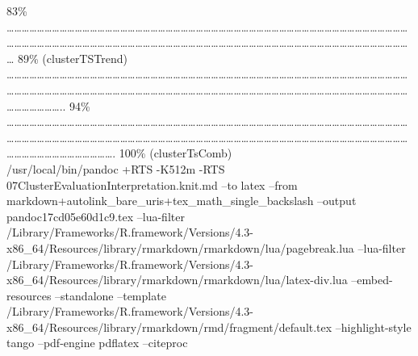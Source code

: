 \documentclass[
]{article}
\begin{document}
\textbar{} 83\% \textbar{}
\textbar\ldots\ldots\ldots\ldots\ldots\ldots\ldots\ldots\ldots\ldots\ldots\ldots\ldots\ldots\ldots\ldots\ldots\ldots\ldots\ldots\ldots\ldots\ldots\ldots\ldots\ldots\ldots\ldots\ldots\ldots\ldots\ldots\ldots\ldots\ldots\ldots\ldots\ldots\ldots\ldots\ldots\ldots\ldots\ldots\ldots\ldots\ldots\ldots\ldots\ldots\ldots\ldots\ldots\ldots\ldots\ldots\ldots\ldots\ldots\ldots\ldots\ldots\ldots\ldots\ldots\ldots\ldots\ldots\ldots\ldots\ldots\ldots\ldots\ldots\ldots\ldots\ldots\ldots\ldots\ldots\ldots\ldots\ldots\ldots\ldots\ldots\ldots\ldots\ldots\ldots\ldots\ldots\ldots\ldots\ldots\ldots\ldots\ldots\ldots\ldots\ldots\ldots\ldots\ldots\ldots\ldots\ldots{}
\textbar{} 89\% (clusterTSTrend) \textbar{}
\textbar\ldots\ldots\ldots\ldots\ldots\ldots\ldots\ldots\ldots\ldots\ldots\ldots\ldots\ldots\ldots\ldots\ldots\ldots\ldots\ldots\ldots\ldots\ldots\ldots\ldots\ldots\ldots\ldots\ldots\ldots\ldots\ldots\ldots\ldots\ldots\ldots\ldots\ldots\ldots\ldots\ldots\ldots\ldots\ldots\ldots\ldots\ldots\ldots\ldots\ldots\ldots\ldots\ldots\ldots\ldots\ldots\ldots\ldots\ldots\ldots\ldots\ldots\ldots\ldots\ldots\ldots\ldots\ldots\ldots\ldots\ldots\ldots\ldots\ldots\ldots\ldots\ldots\ldots\ldots\ldots\ldots\ldots\ldots\ldots\ldots\ldots\ldots\ldots\ldots\ldots\ldots\ldots\ldots\ldots\ldots\ldots\ldots\ldots\ldots\ldots\ldots\ldots\ldots\ldots\ldots\ldots\ldots\ldots\ldots\ldots\ldots\ldots\ldots..
\textbar{} 94\% \textbar{}
\textbar\ldots\ldots\ldots\ldots\ldots\ldots\ldots\ldots\ldots\ldots\ldots\ldots\ldots\ldots\ldots\ldots\ldots\ldots\ldots\ldots\ldots\ldots\ldots\ldots\ldots\ldots\ldots\ldots\ldots\ldots\ldots\ldots\ldots\ldots\ldots\ldots\ldots\ldots\ldots\ldots\ldots\ldots\ldots\ldots\ldots\ldots\ldots\ldots\ldots\ldots\ldots\ldots\ldots\ldots\ldots\ldots\ldots\ldots\ldots\ldots\ldots\ldots\ldots\ldots\ldots\ldots\ldots\ldots\ldots\ldots\ldots\ldots\ldots\ldots\ldots\ldots\ldots\ldots\ldots\ldots\ldots\ldots\ldots\ldots\ldots\ldots\ldots\ldots\ldots\ldots\ldots\ldots\ldots\ldots\ldots\ldots\ldots\ldots\ldots\ldots\ldots\ldots\ldots\ldots\ldots\ldots\ldots\ldots\ldots\ldots\ldots\ldots\ldots\ldots\ldots\ldots\ldots\ldots\ldots\ldots.\textbar{}
100\% (clusterTsComb)\\
/usr/local/bin/pandoc +RTS -K512m -RTS
07ClusterEvaluationInterpretation.knit.md --to latex --from
markdown+autolink\_bare\_uris+tex\_math\_single\_backslash --output
pandoc17cd05e60d1c9.tex --lua-filter
/Library/Frameworks/R.framework/Versions/4.3-x86\_64/Resources/library/rmarkdown/rmarkdown/lua/pagebreak.lua
--lua-filter
/Library/Frameworks/R.framework/Versions/4.3-x86\_64/Resources/library/rmarkdown/rmarkdown/lua/latex-div.lua
--embed-resources --standalone --template
/Library/Frameworks/R.framework/Versions/4.3-x86\_64/Resources/library/rmarkdown/rmd/fragment/default.tex
--highlight-style tango --pdf-engine pdflatex --citeproc
\end{document}
